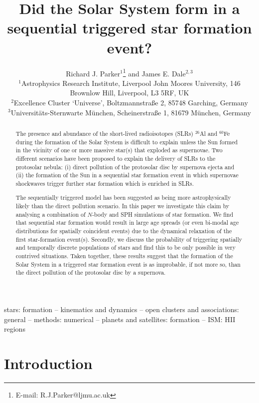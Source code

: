 \documentclass[useAMS,usenatbib,usegraphicx]{mn2e}
\title[A triggered Solar System?]{Did the Solar System form in a sequential triggered star formation event?}
\author[R. J. Parker \& J. E. Dale]{Richard J. Parker$^{1}$\thanks{E-mail: R.J.Parker@ljmu.ac.uk} and James E. Dale$^{2,3}$  \vspace*{0.1cm} \\
$^{1}$Astrophysics Research Institute, Liverpool John Moores University, 146 Brownlow Hill, Liverpool, L3 5RF, UK\\
$^{2}$Excellence Cluster `Universe', Boltzmannstra{\ss}e 2, 85748 Garching, Germany\\
$^{3}$Universit{\"a}ts-Sternwarte M{\"u}nchen, Scheinerstra{\ss}e 1, 81679 M{\"u}nchen, Germany
}
\begin{document}
\date{}
                             
\pagerange{\pageref{firstpage}--\pageref{lastpage}} 

\maketitle

\label{firstpage}

\begin{abstract}
The presence and abundance of the short-lived radioisotopes (SLRs) $^{26}$Al and $^{60}$Fe during the formation of the Solar System is difficult to explain unless the Sun formed in the vicinity of one or more massive star(s) that exploded as supernovae. Two different scenarios have been proposed to explain the delivery of SLRs to the protosolar nebula: (i) direct pollution of the protosolar disc by supernova ejecta and (ii) the formation of the Sun in a sequential star formation event in which supernovae shockwaves trigger further star formation which is enriched in SLRs.

The sequentially triggered model has been suggested as being more astrophysically likely than the direct pollution scenario. In this paper we investigate this claim by analysing a combination of $N$-body and SPH simulations of star formation. We find that sequential star formation would result in large age spreads (or even bi-modal age distributions for spatially coincident events) due to the dynamical relaxation of the first star-formation event(s). Secondly, we discuss the probability of triggering spatially and temporally discrete populations of stars and find this to be only possible in very contrived situations. Taken together, these results suggest that the formation of the Solar System in a triggered star formation event is as improbable, if not more so, than the direct  pollution of the protosolar disc by a supernova.
\end{abstract}

\begin{keywords}   
stars: formation -- kinematics and dynamics -- open clusters and associations: general -- methods: numerical -- planets and satellites: formation -- ISM: H{\small II} regions
\end{keywords}

\section{Introduction}
\end{document}
